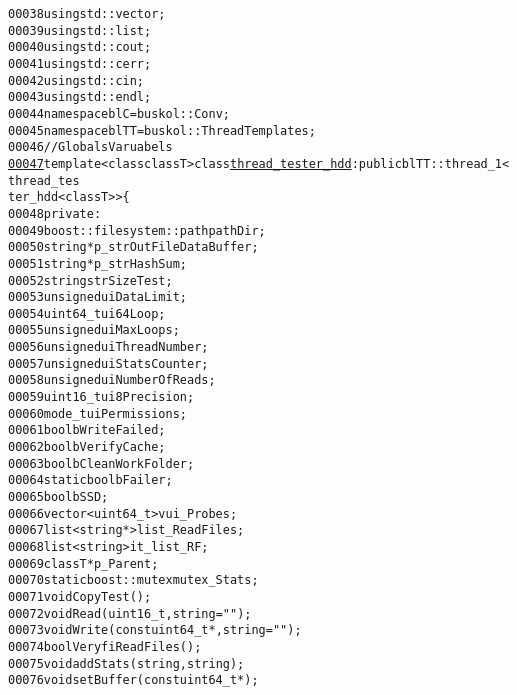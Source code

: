 \begin{footnotesize}
\begin{alltt}
00038 \textcolor{keyword}{using} std::vector;
00039 \textcolor{keyword}{using} std::list;
00040 \textcolor{keyword}{using} std::cout;
00041 \textcolor{keyword}{using} std::cerr;
00042 \textcolor{keyword}{using} std::cin;
00043 \textcolor{keyword}{using} std::endl;
00044 \textcolor{keyword}{namespace }blC = buskol::Conv;
00045 \textcolor{keyword}{namespace }blTT = buskol::ThreadTemplates;
00046 \textcolor{comment}{//Globals Varuabels}
\hypertarget{thread__tester__hdd_8hpp_source_l00047}{}\hyperlink{classthread__tester__hdd}{00047} \textcolor{keyword}{template} <\textcolor{keyword}{class} \textcolor{keyword}{class}T> \textcolor{keyword}{class }\hyperlink{classthread__tester__hdd}{thread_tester_hdd}: \textcolor{keyword}{public} blTT::thread\_1<thread\_tes
      ter\_hdd<classT> >\{
00048     \textcolor{keyword}{private}:
00049         boost::filesystem::path pathDir; 
00050         \textcolor{keywordtype}{string} *p\_strOutFileDataBuffer; 
00051         \textcolor{keywordtype}{string} *p\_strHashSum; 
00052         \textcolor{keywordtype}{string} strSizeTest; 
00053         \textcolor{keywordtype}{unsigned} uiDataLimit; 
00054         uint64\_t ui64Loop;
00055         \textcolor{keywordtype}{unsigned} uiMaxLoops; 
00056         \textcolor{keywordtype}{unsigned} uiThreadNumber; 
00057         \textcolor{keywordtype}{unsigned} uiStatsCounter; 
00058         \textcolor{keywordtype}{unsigned} uiNumberOfReads;
00059         uint16\_t ui8Precision;
00060         mode\_t uiPermissions; 
00061         \textcolor{keywordtype}{bool} bWriteFailed;
00062         \textcolor{keywordtype}{bool} bVerifyCache;
00063         \textcolor{keywordtype}{bool} bCleanWorkFolder;
00064         \textcolor{keyword}{static} \textcolor{keywordtype}{bool} bFailer; 
00065         \textcolor{keywordtype}{bool} bSSD;
00066         vector<uint64\_t> vui\_Probes; 
00067         list<string*> list\_ReadFiles; 
00068         list<string> it\_list\_RF; 
00069         classT *p\_Parent;
00070         \textcolor{keyword}{static} boost::mutex mutex\_Stats; 
00071         \textcolor{keywordtype}{void} CopyTest();
00072         \textcolor{keywordtype}{void} Read(uint16\_t,\textcolor{keywordtype}{string} =\textcolor{stringliteral}{""});
00073         \textcolor{keywordtype}{void} Write(\textcolor{keyword}{const} uint64\_t *,\textcolor{keywordtype}{string} =\textcolor{stringliteral}{""});
00074         \textcolor{keywordtype}{bool} VeryfiReadFiles();
00075         \textcolor{keywordtype}{void} addStats(\textcolor{keywordtype}{string},\textcolor{keywordtype}{string});
00076         \textcolor{keywordtype}{void} setBuffer(\textcolor{keyword}{const} uint64\_t *);

\end{alltt}
\end{footnotesize}
